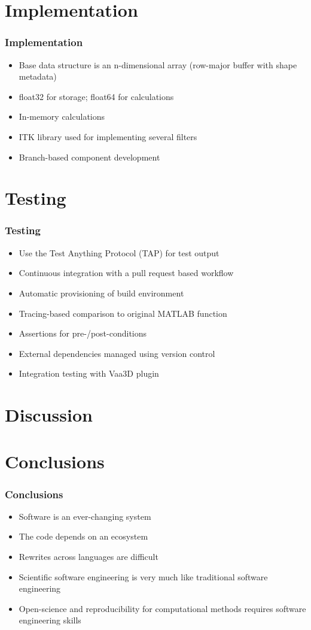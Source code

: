 \section{Implementation}

\begin{frame}
\frametitle{Implementation}
\begin{itemize}
	\item Base data structure is an n-dimensional array (row-major buffer with shape metadata)
	\item float32 for storage; float64 for calculations
	\item In-memory calculations
	\item ITK library used for implementing several filters
	\item Branch-based component development
\end{itemize}
\end{frame}

\section{Testing}

\begin{frame}
\frametitle{Testing}
\begin{itemize}
	\item Use the Test Anything Protocol (TAP) for test output
	\item Continuous integration with a pull request based workflow
	\item Automatic provisioning of build environment
	\item Tracing-based comparison to original MATLAB function
	\item Assertions for pre-/post-conditions
	\item External dependencies managed using version control
	\item Integration testing with Vaa3D plugin
\end{itemize}
\end{frame}

\section{Discussion}

\section{Conclusions}

\begin{frame}
\frametitle{Conclusions}
\begin{itemize}
	\item Software is an ever-changing system
	\item The code depends on an ecosystem
	\item Rewrites across languages are difficult
	\item Scientific software engineering is very much like traditional software engineering
	\item Open-science and reproducibility for computational methods requires software engineering skills
\end{itemize}
\end{frame}

